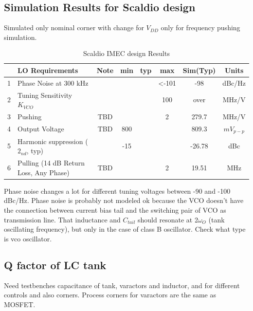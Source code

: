 \documentclass{article}
\begin{document}
\subsection{Simulation Results for Scaldio design}

Simulated only nominal corner with change for $V_{DD}$ only for frequency pushing simulation. 

\begin{table}[ht]
	\centering
	\begin{tabular}{|c|l|c|c|c|c|c|c|}
		\hline
		& LO Requirements & Note & min & typ & max & Sim(Typ) & Units \\
		\hline
		1 & Phase Noise at 300 kHz &  &  &  & <-101 & -98 & dBc/Hz  \\ 
		\hline
		2 & Tuning Sensitivity $K_{VCO}$ &  &  &  & 100 & over & MHz/V  \\ 
		\hline
		3 & Pushing & TBD &  &  & 2  & 279.7 & MHz/V  \\ 
		\hline
		4 & Output Voltage & TBD & 800 &  & & 809.3 & $mV_{p-p}$  \\ 
		\hline
		5 & Harmonic suppression ($2_{nd}$, typ) &  & -15 &  & & -26.78 & dBc  \\ 
		\hline
		6 & Pulling (14 dB Return Loss, Any Phase) & TBD &  &  & 2  & 19.51 & MHz  \\ 
		\hline
	\end{tabular}
	\label{table-ScaldioResults}
	\caption{Scaldio IMEC design Results}
\end{table}

Phase noise changes a lot for different tuning voltages between -90 and -100 dBc/Hz. Phase noise is probably not modeled ok because the VCO doesn't have the connection between current bias tail and the switching pair of VCO as transmission line. That inductance and $C_{tail}$ should resonate at 2$\omega_O$ (tank oscillating frequency), but only in the case of class B oscillator. Check what type is vco oscillator. %

\newpage

\subsection{Q factor of LC tank}

Need testbenches capacitance of tank, varactors and inductor, and for different controls and also corners. Process corners for varactors are the same as MOSFET.
\end{document}
